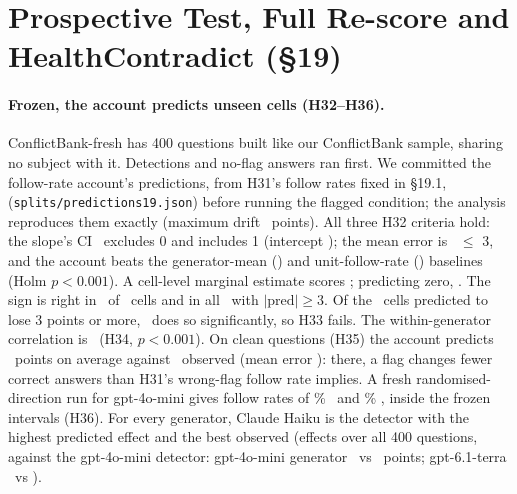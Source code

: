 \section{Prospective Test, Full Re-score and HealthContradict (\S19)}
\label{app:fresh}


\paragraph{Frozen, the account predicts unseen cells (H32--H36).} ConflictBank-fresh has 400 questions
built like our ConflictBank sample, sharing no subject with it. Detections and no-flag answers ran first. We
committed the follow-rate account's predictions, from H31's follow rates fixed in \S19.1,
(\texttt{splits/predictions19.json}) before running the flagged condition; the analysis reproduces them exactly (maximum
drift \frDrift\ points). All three H32 criteria hold: the slope's CI \frSlopeCI\ excludes 0 and includes 1 (intercept
\frIntercept); the mean error is \frMae\ $\le$ 3, and the account beats the generator-mean (\frMaeGen) and
unit-follow-rate (\frMaeOnes) baselines (Holm $p<0.001$). A cell-level marginal estimate scores \frMaeMarg;
predicting zero, \frMaeZero. The sign is right in \frSignAgree\ of \frN\ cells and in all \frBigN\ with
$|\text{pred}|\ge3$. Of the \frHarmN\ cells predicted to lose 3 points or more, \frHarmConf\ does so significantly, so
H33 fails. The within-generator correlation is \frRWithin\ (H34, $p<0.001$). On clean questions (H35) the account
predicts \frCleanPred\ points on average against \frCleanObs\ observed (mean error \frCleanMae): there, a flag
changes fewer correct answers than H31's wrong-flag follow rate implies. A fresh randomised-direction run for
gpt-4o-mini gives follow rates of \frFollowR\% \frFollowRCI\ and \frFollowW\% \frFollowWCI, inside the frozen
intervals (H36). For every generator, Claude Haiku is the detector with the highest predicted effect and the best observed
(effects over all 400 questions, against the gpt-4o-mini detector: gpt-4o-mini generator \frSelMiniObs\ vs \frMiniDetMiniObs\ points; gpt-6.1-terra
\frSelTerraObs\ vs \frMiniDetTerraObs).

